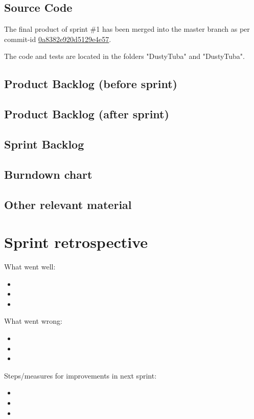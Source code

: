\documentclass[a4paper,11pt]{article}
\begin{document}

\subsection{Source Code}
The final product of sprint \#1 has been merged into the master branch as per commit-id  \href{https://github.com/omegahm/DBP2P/commit/0a8382e920d5129e4e57a7e54018b8769dcb3273}{0a8382e920d5129e4e57}.

The code and tests are located in the folders "DustyTuba" and "DustyTuba".

\subsection{Product Backlog (before sprint)}

\subsection{Product Backlog (after sprint)}

\subsection{Sprint Backlog}

\subsection{Burndown chart}

\subsection{Other relevant material}


\section{Sprint retrospective}


What went well:
\begin{itemize}
\item 
\item 
\item 
\end{itemize}

\noindent
What went wrong:
\begin{itemize}
\item 
\item 
\item 
\end{itemize}

\noindent
Steps/measures for improvements in next sprint:
\begin{itemize}
\item 
\item 
\item 
\end{itemize}
\end{document}

